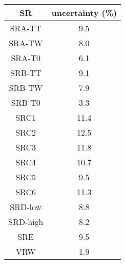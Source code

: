 \begin{tabular}{c||c} \hline\hline
{\bf SR} & {\bf uncertainty (\%)} \\ \hline
SRA-TT & 9.5\\ \hline
SRA-TW & 8.0\\ \hline
SRA-T0 & 6.1\\ \hline
SRB-TT & 9.1\\ \hline
SRB-TW & 7.9\\ \hline
SRB-T0 & 3.3\\ \hline
SRC1 & 11.4\\ \hline
SRC2 & 12.5\\ \hline
SRC3 & 11.8\\ \hline
SRC4 & 10.7\\ \hline
SRC5 & 9.5\\ \hline
SRC6 & 11.3\\ \hline
SRD-low & 8.8\\ \hline
SRD-high & 8.2\\ \hline
SRE & 9.5\\ \hline
VRW & 1.9\\ \hline
\hline
\end{tabular}
